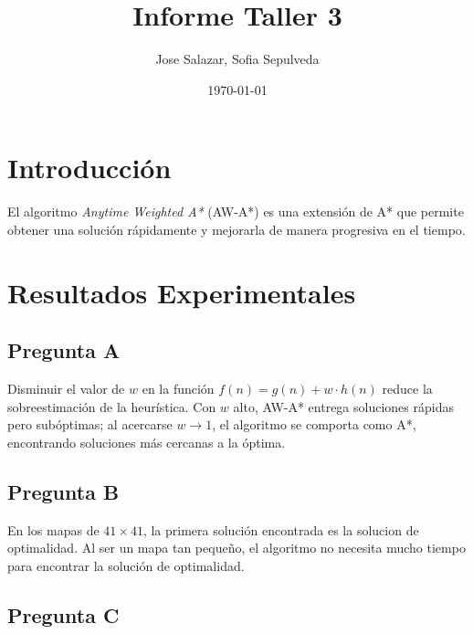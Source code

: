 \documentclass[12pt,a4paper]{article}
\title{Informe Taller 3}
\author{Jose Salazar, Sofia Sepulveda}
\date{\today}
\begin{document}
\maketitle

\section{Introducción}
El algoritmo \textit{Anytime Weighted A*} (AW-A*) es una extensión de A* que permite obtener una solución rápidamente y mejorarla de manera progresiva en el tiempo. 

\section{Resultados Experimentales}
\subsection{Pregunta A}
Disminuir el valor de $w$ en la función $f(n) = g(n) + w \cdot h(n)$ reduce la sobreestimación de la heurística. 
Con $w$ alto, AW-A* entrega soluciones rápidas pero subóptimas; al acercarse $w \to 1$, el algoritmo se comporta como A*, encontrando soluciones más cercanas a la óptima.
\subsection{Pregunta B}
En los mapas de $41 \times 41$, la primera solución encontrada es la solucion de optimalidad.
Al ser un mapa tan pequeño, el algoritmo no necesita mucho tiempo para encontrar la solución de optimalidad.

\subsection{Pregunta C}
\end{document}
